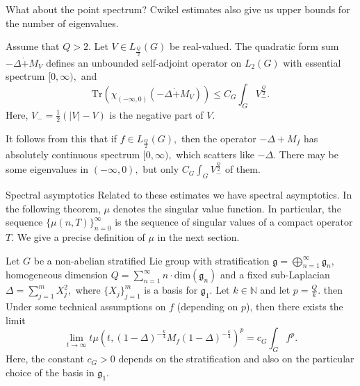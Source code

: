 \documentclass{beamer}
\numberwithin{equation}{section}
\theoremstyle{plain}
\theoremstyle{plain}
\theoremstyle{definition}
\theoremstyle{plain}
\theoremstyle{plain}
\theoremstyle{definition}
\newcommand{\Tr}{\mathrm{Tr}}
\newcommand{\gf}{\mathfrak{g}}
\begin{document}
\begin{frame}{What about the point spectrum?}
  Cwikel estimates also give us upper bounds for the number of eigenvalues.
\begin{theorem}\label{CLR_theorem}
    Assume that $Q>2.$ Let $V \in L_{\frac{Q}{2}}(G)$ be real-valued. The quadratic form sum $-\Delta\dot{+}M_V$
    defines an unbounded self-adjoint operator on $L_2(G)$ with essential spectrum $[0,\infty),$ and
    \[
        \Tr(\chi_{(-\infty,0)}(-\Delta\dot{+}M_V)) \leq C_{G}\int_{G} V_-^{\frac{Q}{2}}.
    \]
    Here, $V_- = \frac{1}{2}(|V|-V)$ is the negative part of $V.$
\end{theorem}
{\color{red}
It follows from this that if $f \in L_{\frac{Q}{2}}(G),$ then the operator $-\Delta+M_f$ has absolutely continuous spectrum $[0,\infty),$ which scatters like $-\Delta.$
There may be some eigenvalues in $(-\infty,0),$ but only $C_G\int_G V_-^{\frac{Q}{2}}$ of them.
}
\end{frame}




\begin{frame}{Spectral asymptotics}
Related to these estimates we have spectral asymptotics. In the following theorem, $\mu$ denotes the singular value function. In particular, the sequence $\{\mu(n,T)\}_{n=0}^\infty$ is the sequence of singular values of a compact operator $T.$ We give a precise definition of $\mu$ in the next section.
\begin{theorem}\label{main_asymptotic_formula}
Let $G$ be a non-abelian stratified Lie group with stratification $\gf = \bigoplus_{n=1}^\infty \gf_n,$ homogeneous dimension $Q = \sum_{n=1}^\infty n\cdot \mathrm{dim}(\gf_n)$
and a fixed sub-Laplacian $\Delta = \sum_{j=1}^m X_j^2,$ where $\{X_j\}_{j=1}^m$ is a basis for $\gf_1.$ Let $k\in\mathbb{N}$ and let $p=\frac{Q}{k}.$
then {\color{red} Under some technical assumptions on $f$ (depending on $p$),}
then there exists the limit
$$\lim_{t\to\infty} t\mu(t,(1-\Delta)^{-\frac{k}{4}}M_f(1-\Delta)^{-\frac{k}{4}})^p=c_G\int_G f^p.$$
Here, the constant $c_G>0$ depends on the stratification and also on the particular choice of the basis in $\gf_1.$
\end{theorem}
\end{frame}
\end{document}
